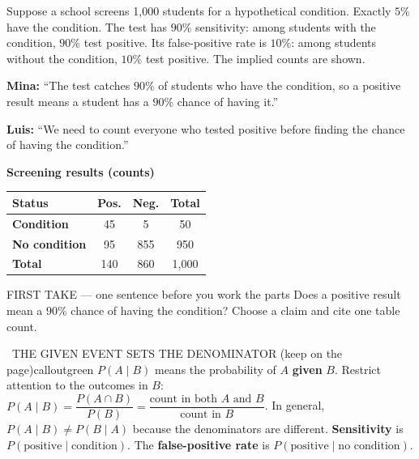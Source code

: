 \documentclass[11pt]{article}
\begin{document}


Suppose a school screens 1{,}000 students for a hypothetical condition. Exactly $5\%$ have the condition. The test has $90\%$ sensitivity: among students with the condition, $90\%$ test positive. Its false-positive rate is $10\%$: among students without the condition, $10\%$ test positive. The implied counts are shown.\par\smallskip \textbf{Mina:} ``The test catches $90\%$ of students who have the condition, so a positive result means a student has a $90\%$ chance of having it.''\par \textbf{Luis:} ``We need to count everyone who tested positive before finding the chance of having the condition.''\par
\begin{center}
\textbf{Screening results (counts)}\par\smallskip
\begin{tabular}{|l|c|c|c|}
\hline
\textbf{Status} & \textbf{Pos.} & \textbf{Neg.} & \textbf{Total} \\ \hline
\textbf{Condition} & 45 & 5 & 50 \\ \hline
\textbf{No condition} & 95 & 855 & 950 \\ \hline
\textbf{Total} & 140 & 860 & 1{,}000 \\ \hline
\end{tabular}
\end{center}
\begin{firsttakebox}{FIRST TAKE --- one sentence before you work the parts}
Does a positive result mean a $90\%$ chance of having the condition? Choose a claim and cite one table count.
\workspace{0.9in}
\end{firsttakebox}

\begin{callout}{\IconBook\ THE GIVEN EVENT SETS THE DENOMINATOR (keep on the page)}{calloutgreen}
$P(A\mid B)$ means the probability of $A$ \textbf{given} $B$. Restrict attention to the outcomes in $B$:
$P(A\mid B)=\dfrac{P(A\cap B)}{P(B)}=\dfrac{\text{count in both }A\text{ and }B}{\text{count in }B}$.
In general, $P(A\mid B)\neq P(B\mid A)$ because the denominators are different.
\textbf{Sensitivity} is $P(\text{positive}\mid\text{condition})$.
The \textbf{false-positive rate} is $P(\text{positive}\mid\text{no condition})$.
\end{callout}
\end{document}
